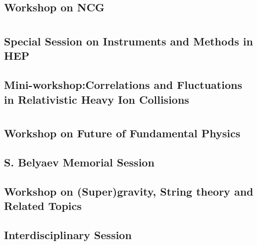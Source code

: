 \subsection{Workshop on NCG}

\clearpage

\section{}
\subsection{Special Session on Instruments and Methods in HEP}

\clearpage

\subsection{Mini-workshop:Correlations and Fluctuations in Relativistic Heavy Ion Collisions}

\clearpage

\section{}
\subsection{Workshop on Future of Fundamental Physics}

\clearpage

\subsection{S. Belyaev Memorial Session}

\clearpage

\subsection{Workshop on (Super)gravity, String theory and Related Topics}

\clearpage

\subsection{Interdisciplinary Session}

\clearpage


